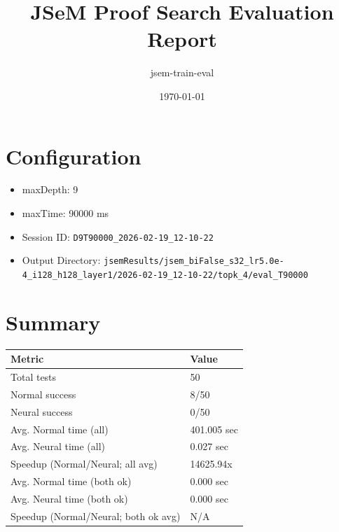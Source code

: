 \documentclass[a4paper,10pt]{article}
\title{JSeM Proof Search Evaluation Report}
\author{jsem-train-eval}
\date{\today}
\begin{document}
\maketitle

\section{Configuration}
\begin{itemize}
\item maxDepth: 9
\item maxTime: 90000 ms
\item Session ID: \texttt{D9T90000\_2026-02-19\_12-10-22}
\item Output Directory: \texttt{jsemResults/jsem\_biFalse\_s32\_lr5.0e-4\_i128\_h128\_layer1/2026-02-19\_12-10-22/topk\_4/eval\_T90000}
\end{itemize}

\section{Summary}
\begin{tabular}{ll}
\toprule
\textbf{Metric} & \textbf{Value} \\
\midrule
Total tests & 50 \\
Normal success & 8/50 \\
Neural success & 0/50 \\
\midrule
Avg. Normal time (all) & 401.005 sec \\
Avg. Neural time (all) & 0.027 sec \\
Speedup (Normal/Neural; all avg) & 14625.94x \\
Avg. Normal time (both ok) & 0.000 sec \\
Avg. Neural time (both ok) & 0.000 sec \\
Speedup (Normal/Neural; both ok avg) & N/A \\
\bottomrule
\end{tabular}
\end{document}
